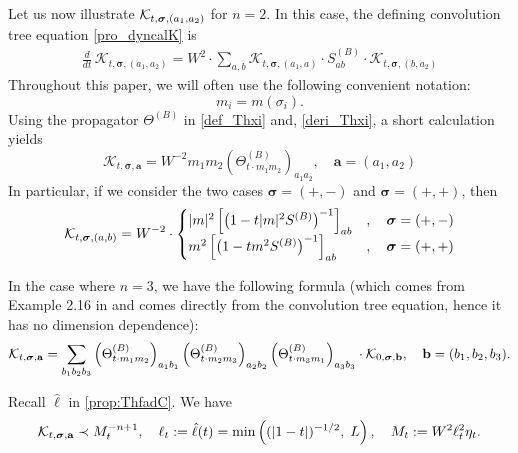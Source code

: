 Let us now illustrate ${\cal K}_{t,\boldsymbol{\sigma},(a_{1},a_{2})}$ for $n=2$. In this case, the defining convolution tree equation  \eqref{pro_dyncalK} is 
\begin{align}
    \frac{d}{dt}\, \mathcal{K}_{t, \boldsymbol{\sigma}, (a_1, a_2)} = W^{2} \cdot \sum_{a, b} \mathcal{K}_{t, \boldsymbol{\sigma}, (a_1, a)} \cdot S^{(B)}_{ab} \cdot \mathcal{K}_{t, \boldsymbol{\sigma}, (b, a_2)}
\end{align}
Throughout this paper, we will often use the following convenient notation: 
\begin{equation}\label{eq_defm_i}
    m_i = m(\sigma_i).
\end{equation}
Using the propagator  $\Theta^{(B)}$ in \eqref{def_Thxi} and, \eqref{deri_Thxi}, a short calculation yields
\begin{equation}\label{Kn2sol}
    \mathcal{K}_{t, \boldsymbol{\sigma}, \textbf{a}} = W^{-2} m_1 m_2 \left(\Theta^{(B)}_{t \cdot m_1 m_2}\right)_{a_1 a_2}, \quad \textbf{a} = (a_1, a_2)
\end{equation}
In particular, if we consider the two cases $\boldsymbol{\sigma}=(+,-)$ and $\boldsymbol{\sigma}=(+,+)$, then
\begin{equation}\label{Kn2sol2}
{\cal K}_{t,\boldsymbol{\sigma},(a,b)}
=   W^{-2} \cdot \begin{cases}
     |m |^2\left[\left(1- {  t }|m |^2 S^{(B)}\right)^{-1}\right]_{ab} &, \quad \boldsymbol{\sigma}=(+,-)\\
  m^2\left[\left(1- {  t } m^2 S^{(B)}\right)^{-1}\right]_{ab}  &, \quad \boldsymbol{\sigma}=(+,+)    
\end{cases}
\end{equation}

In the case where $n=3$, we have the following formula (which comes from Example 2.16 in \cite{YY_25} and comes directly from the convolution tree equation, hence it has no dimension dependence):
$$
{\cal K}_{t, \boldsymbol{\sigma}, \textbf{a}} = \sum_{b_1 b_2 b_3} \left(\Theta^{(B)}_{t \cdot m_1 m_2}\right)_{a_1 b_1} \left(\Theta^{(B)}_{t \cdot m_2 m_3}\right)_{a_2 b_2} \left(\Theta^{(B)}_{t \cdot m_3 m_1}\right)_{a_3 b_3} \cdot {\cal K}_{0, \boldsymbol{\sigma}, \textbf{b}}, \quad \textbf{b} = (b_1, b_2, b_3).
$$

\begin{lemma}\label{ML:Kbound}
Recall $\hat \ell $ in \eqref{prop:ThfadC}. We have
\begin{equation}\label{eq:bcal_k}
  {\cal K}_{t, \boldsymbol{\sigma}, \textbf{a}}  \prec M_{t}^{-n+1},\quad  \ell_t :  =\hat\ell(t)= \min\left((|1-t|)^{-1/2},\; L\right), \quad M_{t}:=W^{2}\ell_{t}^{2}\eta_{t}.     
\end{equation}
\end{lemma}


